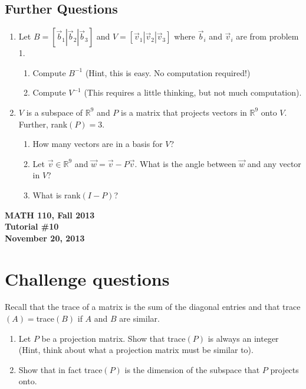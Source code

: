 \documentclass[11pt]{exam}
\newcommand{\R}{\mathbb{R}}
\newcommand{\mthCourse}{MATH 110}
\newcommand{\mthTerm}{Fall 2013}
\newcommand{\mthTutorialNumber}{10}
\newcommand{\mthDate}{November 20, 2013}
\begin{document}
\subsection*{Further Questions}
\begin{enumerate}[resume]
	
	\item 
	Let $B=[\vec b_1|\vec b_2|\vec b_3]$ and $V=[\vec v_1|\vec v_2|\vec v_3]$
	where $\vec b_i$ and $\vec v_i$ are from problem 1.
	\begin{enumerate}
		\item Compute $B^{-1}$ (Hint, this is easy. No computation required!)
		\item Compute $V^{-1}$ (This requires a little thinking, but not
			much computation).
	\end{enumerate}
	\item $V$ is a subspace of $\R^9$ and $P$ is a matrix that projects vectors
		in $\R^9$ onto $V$.  Further, rank$(P)=3$.
		\begin{enumerate}
			\item How many vectors are in a basis for $V$?
			\item Let $\vec v\in \R^9$ and $\vec w = \vec v-P\vec v$. What
				is the angle between $\vec w$ and any vector in $V$?
			\item What is rank$(I-P)$?
		\end{enumerate}
\end{enumerate}




\newpage
{
	\begin{center}
		{\bf \mthCourse, \mthTerm}\\ 
		{\bf Tutorial \#\mthTutorialNumber}\\
		{\bf \mthDate}
	\end{center}
}

\section*{Challenge questions}

	Recall that the trace of a matrix is the sum of the diagonal entries
	and that trace$(A)=$trace$(B)$ if $A$ and $B$ are similar.
\begin{enumerate}[resume]
	\item Let $P$ be a projection matrix.  Show that trace$(P)$ is always an integer (Hint, think
	about what a projection matrix must be similar to).
	\item Show that in fact trace$(P)$ is the dimension of the subspace that $P$ projects onto.

\end{enumerate}
\end{document}
